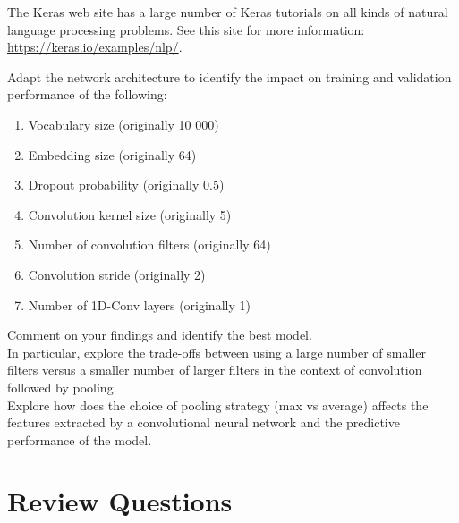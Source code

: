 \begin{withcode}
\begin{resourcebox}
The Keras web site has a large number of Keras tutorials on all kinds of natural language processing problems. See this site for more information: \small\url{https://keras.io/examples/nlp/}\normalsize.
\end{resourcebox}


\begin{exerciseboxcomputer}

Adapt the network architecture to identify the impact on training and validation performance of the following:
   \begin{enumerate}
      \item Vocabulary size (originally 10 000)
      \item Embedding size (originally 64)
      \item Dropout probability (originally 0.5)
      \item Convolution kernel size (originally 5)
      \item Number of convolution filters (originally 64)
      \item Convolution stride (originally 2)
      \item Number of 1D-Conv layers (originally 1)
   \end{enumerate} 
Comment on your findings and identify the best model.\\
   
In particular, explore the trade-offs between using a large number of smaller filters versus a smaller number of larger filters in the context of convolution followed by pooling. \\

Explore how does the choice of pooling strategy (max vs average) affects the features extracted by a convolutional neural network and the predictive performance of the model.\\
\end{exerciseboxcomputer}

\end{withcode}


\FloatBarrier

\section{Review Questions}
